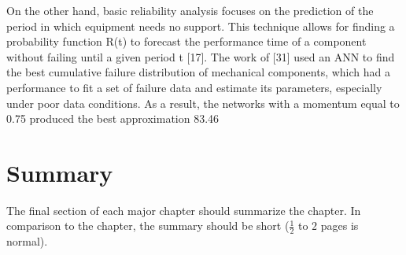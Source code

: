 On the other hand, basic reliability analysis focuses on the prediction of the period in which equipment needs no support. This technique allows for finding a probability function R(t) to forecast the performance time of a component without failing until a given period t [17]. The work of [31] used an ANN to find the best cumulative failure distribution of mechanical components, which had a performance to fit a set of failure data and estimate its parameters, especially under poor data conditions. As a result, the networks with a momentum equal to 0.75 produced the best approximation 83.46%






\section{Summary}
\label{s:Related-Works-Summary}

The final section of each major chapter should summarize the chapter. In comparison to the chapter, the summary should be short ($\frac{1}{2}$ to $2$ pages is normal).
